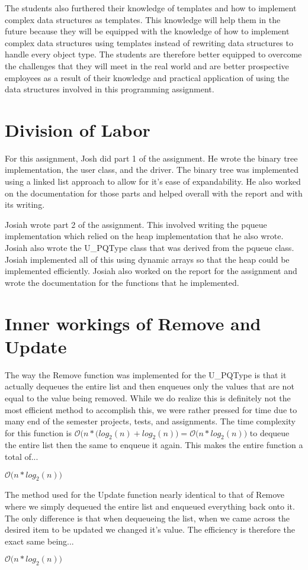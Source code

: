 \documentclass[pdftex, 12pt]{article}
\begin{document}
The students also furthered their knowledge of templates and how to implement complex data structures as templates. This
knowledge will help them in the future because they will be equipped with the knowledge of how to implement complex data
structures using templates instead of rewriting data structures to handle every object type. The students are therefore
better equipped to overcome the challenges that they will meet in the real world and are better prospective employees as
a result of their knowledge and practical application of using the data structures involved in this programming
assignment.

\section{Division of Labor}

For this assignment, Josh did part 1 of the assignment. He wrote the binary tree implementation, the user class, and the
driver. The binary tree was implemented using a linked list approach to allow for it's ease of expandability. He also
worked on the documentation for those parts and helped overall with the report and with its writing.

Josiah wrote part 2 of the assignment. This involved writing the pqueue implementation which relied on the heap
implementation that he also wrote. Josiah also wrote the U\_PQType class that was derived from the pqueue class. Josiah
implemented all of this using dynamic arrays so that the heap could be implemented efficiently. Josiah also worked on
the report for the assignment and wrote the documentation for the functions that he implemented. 

\section{Inner workings of Remove and Update}

The way the Remove function was implemented for the U\_PQType is that it actually dequeues the entire list and then
enqueues only the values that are not equal to the value being removed.  While we do realize this is definitely not the
most efficient method to accomplish this, we were rather pressed for time due to many end of the semester projects,
tests, and assignments.  The time complexity for this function is
$\mathcal{O}\Big(n*(log_2(n)+log_2(n)\Big)=\mathcal{O}\Big(n*log_2(n)\Big)$ to dequeue the entire list then the same to
enqueue it again. This makes the entire function a total of...

$\mathcal{O}\Big(n*log_2(n)\Big)$

The method used for the Update function nearly identical to that of Remove where we simply dequeued the entire list and
enqueued everything back onto it.  The only difference is that when dequeueing the list, when we came across the desired
item to be updated we changed it's value.  The efficiency is therefore the exact same being...

$\mathcal{O}\Big(n*log_2(n)\Big)$
\end{document}
